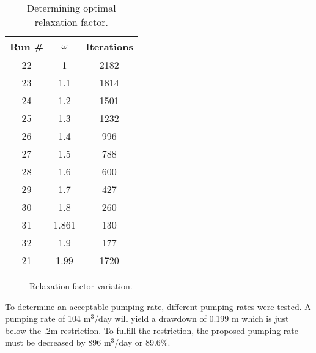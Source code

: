 \documentclass[titlepage,11pt]{article}
\begin{document}
\begin{table}[!h]
\begin{center}
\caption{Determining optimal relaxation factor.}
\begin{tabular}{|c|c|c|}
\hline
{\bf Run \#} & {\bf $\omega$} & {\bf Iterations} \\

\hline
        22 &          1 &         2182 \\
\hline
        23 &        1.1 &         1814 \\
\hline
        24 &        1.2 &         1501 \\
\hline
        25 &        1.3 &         1232 \\
\hline
        26 &        1.4 &         996 \\
\hline
        27 &        1.5 &         788 \\
\hline
        28 &        1.6 &         600 \\
\hline
        29 &        1.7 &         427 \\
\hline
        30 &        1.8 &         260 \\
\hline
        31 &        1.861 &         130 \\
\hline
        32 &         1.9 &         177 \\
\hline
        21 &        1.99 &         1720 \\
\hline
\end{tabular}
\end{center}
\end{table}

\begin{figure}[!h]
   \begin{center}
     \caption{Relaxation factor variation.}
  \end{center}
\end{figure}

\break To determine an acceptable pumping rate, different pumping
rates were tested. A pumping rate of 104 m$^3$/day will yield a
drawdown of 0.199 m which is just below the .2m restriction. To
fulfill the restriction, the proposed pumping rate must be decreased
by 896 m$^3$/day or 89.6\%.



\newpage
\end{document}
